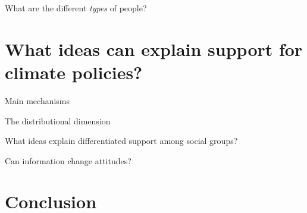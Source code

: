 \begin{framefont}{\small}
\begin{frame}{What are the different \textit{types} of people?}
\end{frame}


\section{What ideas can explain support for climate policies?}

\begin{frame}{Main mechanisms}
\end{frame}

\begin{frame}{The distributional dimension}
\end{frame}

\begin{frame}{What ideas explain differentiated support among social groups?}
\end{frame}

\begin{frame}{Can information change attitudes?}
\end{frame}

\section{Conclusion}


\end{framefont}
